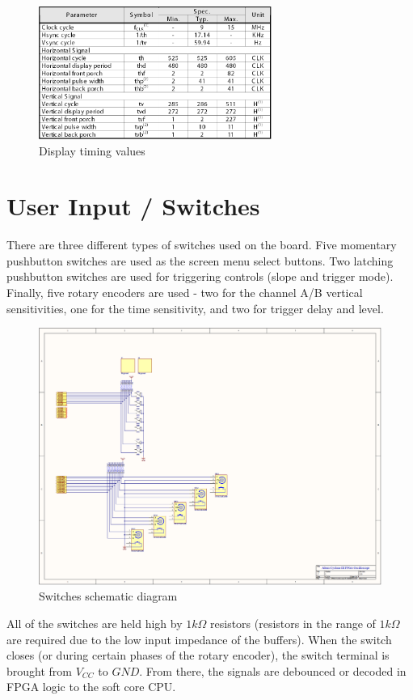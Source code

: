\begin{figure}[ht!]
    \centering
    \includegraphics[width=3in]{Timing/disp_timing_chart.png}
		\caption{Display timing values}
\end{figure}

\section{User Input / Switches}

There are three different types of switches used on the board. Five momentary pushbutton switches are used as the screen menu select buttons. Two latching pushbutton switches are used for triggering controls (slope and trigger mode). Finally, five rotary encoders are used - two for the channel A/B vertical sensitivities, one for the time sensitivity, and two for trigger delay and level.

\begin{figure}[ht!]
    \centering
    \includegraphics[width=6in]{circuit/switches.png}
		\caption{Switches schematic diagram}
\end{figure}

All of the switches are held high by $1k\Omega$ resistors (resistors in the range of $1k\Omega$ are required due to the low input impedance of the buffers). When the switch closes (or during certain phases of the rotary encoder), the switch terminal is brought from $V_{CC}$ to $GND$. From there, the signals are debounced or decoded in FPGA logic to the soft core CPU.

